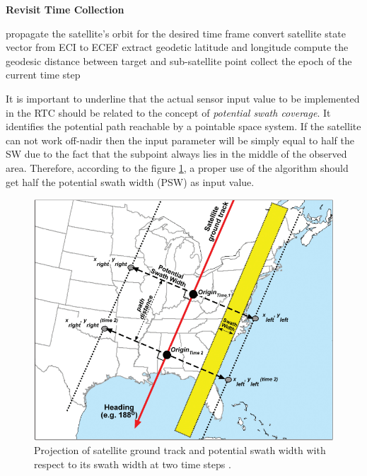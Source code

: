 \begin{algorithm}
      \caption{\textbf{Revisit Time Collection}}
      \begin{algorithmic}[1]
                  \State propagate the satellite's orbit for the desired time frame
                        \State convert satellite state vector from ECI to ECEF
                        \State extract geodetic latitude and longitude
                        \State compute the geodesic distance between target and sub-satellite point
                              \State collect the epoch of the current time step
                        \EndIf
                  \EndFor
            \EndProcedure
      \end{algorithmic}
\end{algorithm}

It is important to underline that the actual sensor input value to be implemented in the RTC should be related to the concept of \textit{potential swath coverage}.
It identifies the potential path reachable by a pointable space system.
If the satellite can not work off-nadir then the input parameter will be simply equal to half the SW due to the fact that the subpoint always lies in the middle of the observed area.
Therefore, according to the figure \ref{potential_sw_fig}, a proper use of the algorithm should get half the potential swath width (PSW) as input value.
\begin{figure}[H]
      \centering
      \includegraphics[scale=0.6]{img/potential_sw.png}
      \caption{Projection of satellite ground track and potential swath width with respect to its swath width at two time steps \cite{hodgson2008modeling}.}
      \label{potential_sw_fig}
\end{figure}